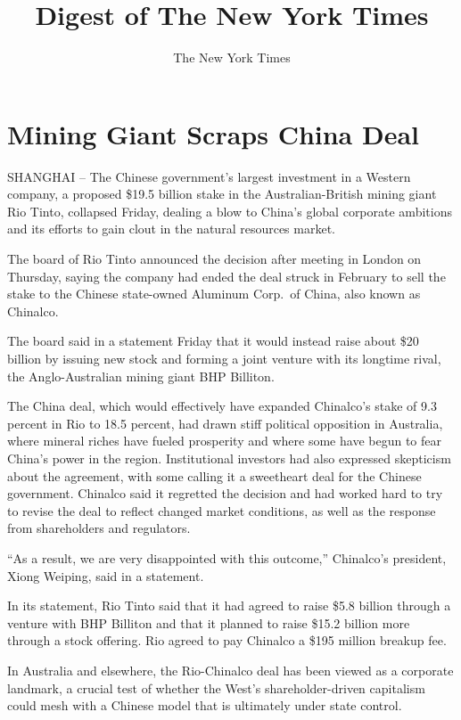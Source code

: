 \documentclass[12pt,a4paper,onecolumn]{article}
\title{Digest of The New York Times}
\author{The New York Times}
\begin{document}
\date{}
\thispagestyle{empty}
\renewcommand\contentsname{\textsf{Digest of The New York Times}}
\textsf{\tableofcontents}
\pagebreak
\setcounter{page}{1}
\section{Mining Giant Scraps China Deal}

SHANGHAI -- The Chinese government's largest investment in a Western company, a proposed \$19.5
billion stake in the Australian-British mining giant Rio Tinto, collapsed Friday, dealing a blow to
China's global corporate ambitions and its efforts to gain clout in the natural resources market.

The board of Rio Tinto announced the decision after meeting in London on Thursday, saying the
company had ended the deal struck in February to sell the stake to the Chinese state-owned Aluminum
Corp.~of China, also known as Chinalco.

The board said in a statement Friday that it would instead raise about \$20 billion by issuing new
stock and forming a joint venture with its longtime rival, the Anglo-Australian mining giant BHP
Billiton.

The China deal, which would effectively have expanded Chinalco's stake of 9.3 percent in Rio to 18.5
percent, had drawn stiff political opposition in Australia, where mineral riches have fueled
prosperity and where some have begun to fear China's power in the region. Institutional investors
had also expressed skepticism about the agreement, with some calling it a sweetheart deal for the
Chinese government. Chinalco said it regretted the decision and had worked hard to try to revise the
deal to reflect changed market conditions, as well as the response from shareholders and regulators.

``As a result, we are very disappointed with this outcome,'' Chinalco's president, Xiong Weiping,
said in a statement.

In its statement, Rio Tinto said that it had agreed to raise \$5.8 billion through a venture with
BHP Billiton and that it planned to raise \$15.2 billion more through a stock offering. Rio agreed
to pay Chinalco a \$195 million breakup fee.

In Australia and elsewhere, the Rio-Chinalco deal has been viewed as a corporate landmark, a crucial
test of whether the West's shareholder-driven capitalism could mesh with a Chinese model that is
ultimately under state control.
\end{document}
